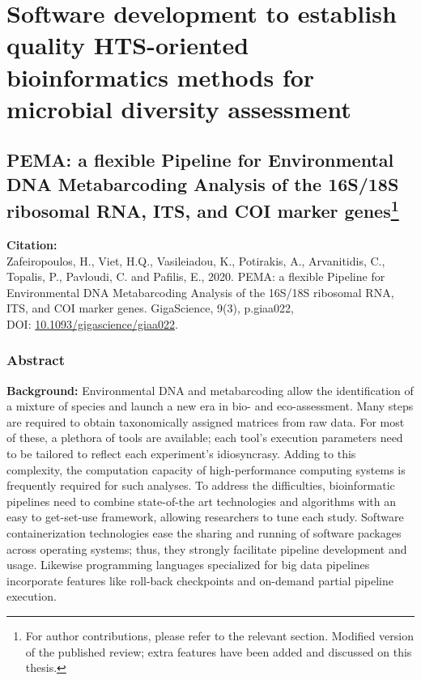 % 
% 

\chapter{Software development to establish quality HTS-oriented bioinformatics methods for microbial diversity assessment}
\label{cha:2}


% 
% 
\section[PEMA: a flexible Pipeline for Environmental DNA Metabarcoding Analysis of the 16S/18S ribosomal RNA, ITS, and COI marker genes]{
   PEMA: a flexible Pipeline for Environmental DNA Metabarcoding Analysis of the 16S/18S ribosomal RNA, ITS, and COI marker genes\footnote{For author contributions, please refer to the relevant section. Modified version of the published review; extra features have been added and discussed on this thesis.}
}
\label{publ:pema}

   \textbf{Citation:} \\ 
   Zafeiropoulos, H., Viet, H.Q., Vasileiadou, K., Potirakis, A., Arvanitidis, C., Topalis, P., Pavloudi, C. and Pafilis, E., 2020. PEMA: a flexible Pipeline for Environmental DNA Metabarcoding Analysis of the 16S/18S ribosomal RNA, ITS, and COI marker genes. GigaScience, 9(3), p.giaa022, \\ 
   DOI: \href{https://doi.org/10.1093/gigascience/giaa022}{10.1093/gigascience/giaa022}.


   \subsection{Abstract}
   \textbf{Background:} 
   Environmental DNA and metabarcoding allow the identification of a mixture of species and launch 
   a new era in bio- and eco-assessment. 
   Many steps are required to obtain taxonomically assigned matrices from raw data. For most of these, 
   a plethora of tools are available; each tool's execution parameters need to be tailored to reflect each experiment's idiosyncrasy. 
   Adding to this complexity, the computation capacity of high-performance computing systems is frequently required for such analyses. 
   To address the difficulties, bioinformatic pipelines need to combine state-of-the art technologies and 
   algorithms with an easy to get-set-use framework, allowing researchers to tune each study. 
   Software containerization technologies ease the sharing and running of software packages across operating systems; 
   thus, they strongly facilitate pipeline development and usage. 
   Likewise programming languages specialized for big data pipelines incorporate features like roll-back checkpoints and on-demand partial pipeline execution.

